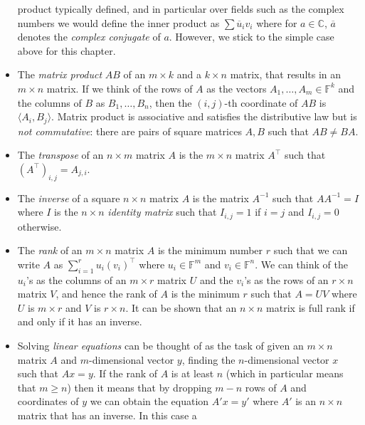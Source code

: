 \begin{itemize}
{    product typically defined, and in particular over fields such as the
    complex numbers we would define the inner product as
    \(\sum \overline{u}_i v_i\) where for \(a\in \mathbb{C}\),
    \(\overline{a}\) denotes the \emph{complex conjugate} of \(a\).
    However, we stick to the simple case above for this chapter.}
\item
  The \emph{matrix product} \(\ensuremath{\mathit{AB}}\) of an
  \(m \times k\) and a \(k\times n\) matrix, that results in an
  \(m\times n\) matrix. If we think of the rows of \(A\) as the vectors
  \(A_1,\ldots,A_m \in \mathbb{F}^k\) and the columns of \(B\) as
  \(B_1,\ldots,B_n\), then the \((i,j)\)-th coordinate of
  \(\ensuremath{\mathit{AB}}\) is \(\langle A_i , B_j \rangle\). Matrix
  product is associative and satisfies the distributive law but is
  \emph{not commutative}: there are pairs of square matrices \(A,B\)
  such that \(\ensuremath{\mathit{AB}} \neq \ensuremath{\mathit{BA}}\).
\item
  The \emph{transpose} of an \(n\times m\) matrix \(A\) is the
  \(m\times n\) matrix \(A^\top\) such that
  \((A^\top)_{i,j} = A_{j,i}\).
\item
  The \emph{inverse} of a square \(n\times n\) matrix \(A\) is the
  matrix \(A^{-1}\) such that \(\ensuremath{\mathit{AA}}^{-1} = I\)
  where \(I\) is the \(n\times n\) \emph{identity matrix} such that
  \(I_{i,j}=1\) if \(i=j\) and \(I_{i,j}=0\) otherwise.
\item
  The \emph{rank} of an \(m\times n\) matrix \(A\) is the minimum number
  \(r\) such that we can write \(A\) as \(\sum_{i=1}^r u_i(v_i)^\top\)
  where \(u_i \in \mathbb{F}^m\) and \(v_i \in \mathbb{F}^n\). We can
  think of the \(u_i\)'s as the columns of an \(m\times r\) matrix \(U\)
  and the \(v_i\)'s as the rows of an \(r\times n\) matrix \(V\), and
  hence the rank of \(A\) is the minimum \(r\) such that
  \(A=\ensuremath{\mathit{UV}}\) where \(U\) is \(m\times r\) and \(V\)
  is \(r\times n\). It can be shown that an \(n\times n\) matrix is full
  rank if and only if it has an inverse.
\item
  Solving \emph{linear equations} can be thought of as the task of given
  an \(m \times n\) matrix \(A\) and \(m\)-dimensional vector \(y\),
  finding the \(n\)-dimensional vector \(x\) such that \(Ax = y\). If
  the rank of \(A\) is at least \(n\) (which in particular means that
  \(m \geq n\)) then it means that by dropping \(m-n\) rows of \(A\) and
  coordinates of \(y\) we can obtain the equation \(A'x = y'\) where
  \(A'\) is an \(n\times n\) matrix that has an inverse. In this case a

\end{itemize}

